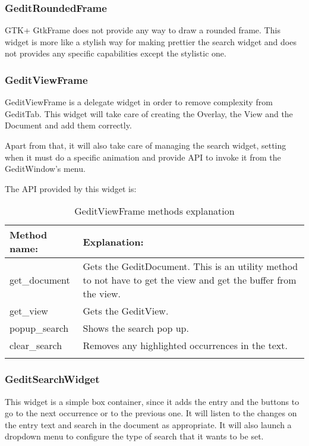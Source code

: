\subsubsection{GeditRoundedFrame}

GTK+ GtkFrame does not provide any way to draw a rounded frame. This widget is more like a stylish way for making prettier the search widget and does not provides any specific capabilities except the stylistic one.

\subsubsection{GeditViewFrame}

GeditViewFrame is a delegate widget in order to remove complexity from GeditTab. This widget will take care of creating the Overlay, the View and the Document and add them correctly.

Apart from that, it will also take care of managing the search widget, setting when it must do a specific animation and provide API to invoke it from the GeditWindow's menu.

The API provided by this widget is:

\begin{table}[H]
  \begin{center}
    \begin{tabularx}{\textwidth}{|X|X|}
      \firsthline
      \textbf{Method name:} & \textbf{Explanation:} \\
      \hline
      get\_document & Gets the GeditDocument. This is an utility method to not have to get the view and get the buffer from the view. \\
      \hline
      get\_view & Gets the GeditView. \\
      \hline
      popup\_search & Shows the search pop up. \\
      \hline
      clear\_search & Removes any highlighted occurrences in the text. \\
      \lasthline
    \end{tabularx}
    \caption{GeditViewFrame methods explanation}
  \end{center}
\end{table}

\subsubsection{GeditSearchWidget}

This widget is a simple box container, since it adds the entry and the buttons to go to the next occurrence or to the previous one. It will listen to the changes on the entry text and search in the document as appropriate. It will also launch a dropdown menu to configure the type of search that it wants to be set.

